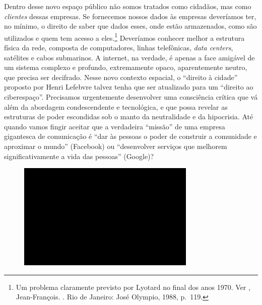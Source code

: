 Dentro desse novo espaço público não somos tratados como cidadãos, mas
como \emph{clientes} dessas empresas. Se fornecemos nossos dados às
empresas deveríamos ter, no mínimo, o direito de saber que dados esses, onde estão armazenados, como são utilizados e quem tem acesso a eles.\footnote{Um problema claramente previsto por Lyotard no final dos anos 1970. Ver , Jean-François. {}. Rio de Janeiro: José Olympio, 1988, p.~119.} Deveríamos conhecer melhor a estrutura física da rede, composta de computadores, linhas telefônicas, \emph{data centers}, satélites e cabos submarinos. A internet, na verdade, é apenas a face amigável de um sistema complexo e
profundo, extremamente opaco, aparentemente neutro, que precisa ser decifrado.
Nesse novo contexto espacial, o ``direito à cidade'' proposto por Henri
Lefebvre talvez tenha que ser atualizado para um ``direito ao
ciberespaço''. Precisamos urgentemente desenvolver uma consciência
crítica que vá além da abordagem condescendente e tecnológica, e que
possa revelar as estruturas de poder escondidas sob o manto da
neutralidade e da hipocrisia. Até quando vamos fingir aceitar que a
verdadeira ``missão'' de uma empresa gigantesca de comunicação é ``dar
às pessoas o poder de construir a comunidade e aproximar o mundo''
(Facebook) ou ``desenvolver serviços que melhorem significativamente a
vida das pessoas'' (Google)?

\begin{figure}[!ht]

\centering
 \includegraphics[width=85mm]{./imgs/im1.jpg}
\caption{\tiny{}}

\end{figure}

